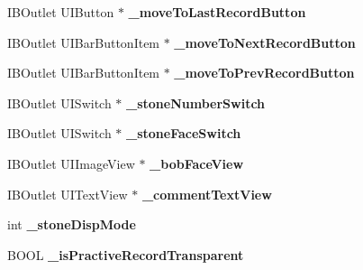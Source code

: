 \begin{DoxyCompactItemize}
\item 
\hypertarget{interface_abstract_record_view_controller_a1650b6eee98b02c083540cbd5bb4625e}{
IBOutlet UIButton $\ast$ {\bfseries \_\-moveToLastRecordButton}}
\label{interface_abstract_record_view_controller_a1650b6eee98b02c083540cbd5bb4625e}

\item 
\hypertarget{interface_abstract_record_view_controller_a0420fc592460a6ae28de1fc7bef20cc6}{
IBOutlet UIBarButtonItem $\ast$ {\bfseries \_\-moveToNextRecordButton}}
\label{interface_abstract_record_view_controller_a0420fc592460a6ae28de1fc7bef20cc6}

\item 
\hypertarget{interface_abstract_record_view_controller_aeacc6f8b5cc426aa4fe89e6109152b1f}{
IBOutlet UIBarButtonItem $\ast$ {\bfseries \_\-moveToPrevRecordButton}}
\label{interface_abstract_record_view_controller_aeacc6f8b5cc426aa4fe89e6109152b1f}

\item 
\hypertarget{interface_abstract_record_view_controller_a1fa14d365bf0622321d357f438d0f024}{
IBOutlet UISwitch $\ast$ {\bfseries \_\-stoneNumberSwitch}}
\label{interface_abstract_record_view_controller_a1fa14d365bf0622321d357f438d0f024}

\item 
\hypertarget{interface_abstract_record_view_controller_a8f82b7b40c8e24c8650bb38c3dd2aca7}{
IBOutlet UISwitch $\ast$ {\bfseries \_\-stoneFaceSwitch}}
\label{interface_abstract_record_view_controller_a8f82b7b40c8e24c8650bb38c3dd2aca7}

\item 
\hypertarget{interface_abstract_record_view_controller_a1c3a85a9d14dcb7b9aeb320cf950aa36}{
IBOutlet UIImageView $\ast$ {\bfseries \_\-bobFaceView}}
\label{interface_abstract_record_view_controller_a1c3a85a9d14dcb7b9aeb320cf950aa36}

\item 
\hypertarget{interface_abstract_record_view_controller_a41fd69fa81bc98a15f5d42e410ba3271}{
IBOutlet UITextView $\ast$ {\bfseries \_\-commentTextView}}
\label{interface_abstract_record_view_controller_a41fd69fa81bc98a15f5d42e410ba3271}

\item 
\hypertarget{interface_abstract_record_view_controller_a192865b1b2d15a7df8f8bc482937b603}{
int {\bfseries \_\-stoneDispMode}}
\label{interface_abstract_record_view_controller_a192865b1b2d15a7df8f8bc482937b603}

\item 
\hypertarget{interface_abstract_record_view_controller_a95974f12d7b77527290f08edbcbeed48}{
BOOL {\bfseries \_\-isPractiveRecordTransparent}}
\label{interface_abstract_record_view_controller_a95974f12d7b77527290f08edbcbeed48}


\end{DoxyCompactItemize}
